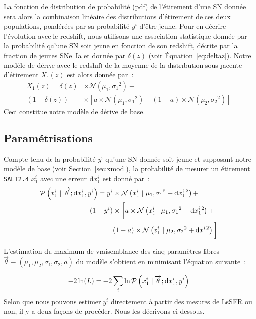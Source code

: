\documentclass[../main/main.tex]{subfiles}
\begin{document}
La fonction de distribution de probabilité (pdf) de l'étirement d'une SN donnée
sera alors la combinaison linéaire des distributions d'étirement de ces deux
populations, pondérées par sa probabilité $y^i$ d'être jeune. Pour en décrire
l'évolution avec le redshift, nous utilisons une association statistique donnée
par la probabilité qu'une SN soit jeune en fonction de son redshift, décrite par
la fraction de jeunes SNe~Ia et donnée par $\delta(z)$ (voir
Équation~\ref{eq:deltaz}). Notre modèle de dérive avec le redshift de la moyenne
de la distribution sous-jacente d'étirement $X_1(z)$ est alors donnée par~:
\begin{align}\label{eq:stretchz}
    X_1(z) = \delta(z)&\times \mathcal{N}(\mu_1,\sigma_1{}^2) + \nonumber \\
    (1-\delta(z))&\times \left[ a\times\mathcal{N}(\mu_1,\sigma_1{}^2) +
    (1-a)\times\mathcal{N}(\mu_2,\sigma_2{}^2) \right]
\end{align}
Ceci constitue notre modèle de dérive de base.

\subsection{Paramétrisations}\label{ssec:pmod}

Compte tenu de la probabilité $y^i$ qu'une SN donnée soit jeune et supposant
notre modèle de base (voir Section~\ref{sec:xmod}), la probabilité de
mesurer un étirement \texttt{SALT2.4} $x_1^i$ avec une erreur $\mathrm{d} x_1^i$ est
donné par~:
\begin{align}\label{eq:likelihoodsnf}
    \mathcal{P}\left(x^i_1 \mid \overrightarrow{\theta}; \mathrm{d}x^i_1, y^i\right) =
    y^i & \times
    \mathcal{N}\left(x^i_1 \mid \mu_1, \sigma_1{}^2+\mathrm{d}x^i_1{}^2\right) +
    \nonumber\\
    (1-y^i) &\times \bigg[
    a \times \mathcal{N}\left(x^i_1 \mid \mu_1,
    \sigma_1{}^2+\mathrm{d}x^i_1{}^2\right) +
    \nonumber\\
    & (1-a) \times \mathcal{N}\left(x^i_1 \mid \mu_2,
    \sigma_2{}^{2}+\mathrm{d}x^i_1{}^2\right) \bigg]
\end{align}

L'estimation du maximum de vraisemblance des cinq paramètres libres
$\overrightarrow{\theta}\equiv({\mu_1, \mu_2, \sigma_1, \sigma_2,a})$ du modèle
s'obtient en minimisant l'équation suivante~:

\begin{equation}\label{eq:likelihood}
    -2\ln(L) = -2 \sum_i \ln \mathcal{P}\left(x_1^i \mid \overrightarrow{\theta};
    \mathrm{d}x_1^i, y^i\right)
\end{equation}
Selon que nous pouvons estimer $y^i$ directement à partir des mesures de LsSFR
ou non, il y a deux façons de procéder. Nous les décrivons ci-dessous.
\end{document}
